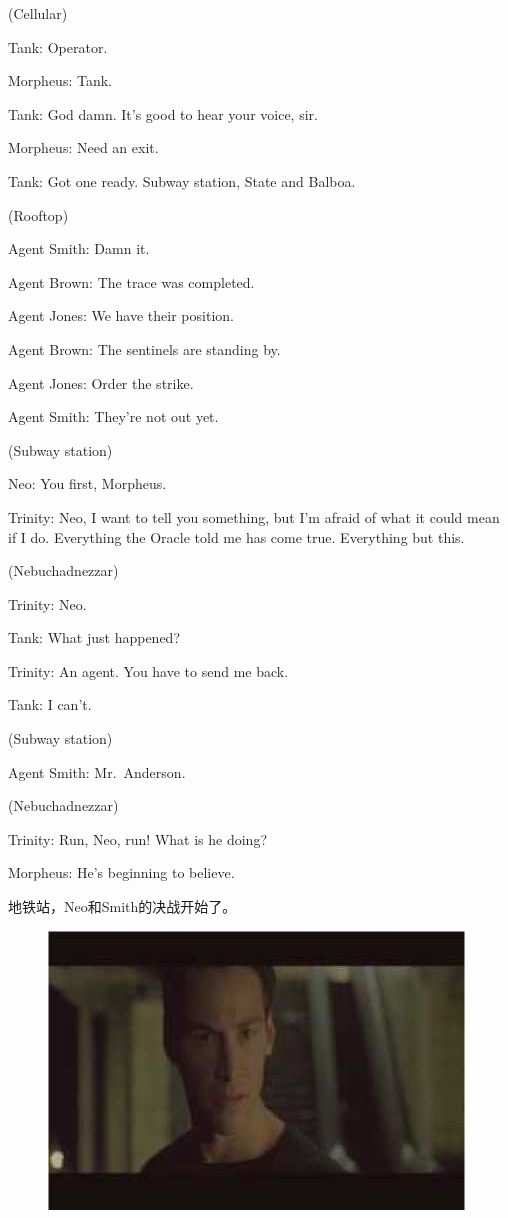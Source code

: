 \documentclass[UTF8]{ctexart}
\newenvironment{myquote}{\color{green} \setlength{\leftskip}{6em} \setlength{\rightskip}{4em} \setlength{\parindent}{-2em}}{\par}
\begin{document}
\begin{myquote}
(Cellular)

Tank: Operator.

Morpheus: Tank.

Tank: God damn. It's good to hear your voice, sir.

Morpheus: Need an exit.

Tank: Got one ready. Subway station, State and Balboa.

(Rooftop)

Agent Smith: Damn it.

Agent Brown: The trace was completed.

Agent Jones: We have their position.

Agent Brown: The sentinels are standing by.

Agent Jones: Order the strike.

Agent Smith: They're not out yet.

(Subway station)

Neo: You first, Morpheus.

Trinity: Neo, I want to tell you something, but I'm afraid of what it could mean if I do. Everything the Oracle told me has come true. Everything but this.

(Nebuchadnezzar)

Trinity: Neo.

Tank: What just happened?

Trinity: An agent. You have to send me back.

Tank: I can't.

(Subway station)

Agent Smith: Mr.~Anderson.

(Nebuchadnezzar)

Trinity: Run, Neo, run! What is he doing?

Morpheus: He's beginning to believe.
\end{myquote}

地铁站，Neo和Smith的决战开始了。

\begin{figure}[htb]
\centering
\includegraphics[width=0.5\linewidth]{fig/read_Matrix-71}
\end{figure}
\end{document}
